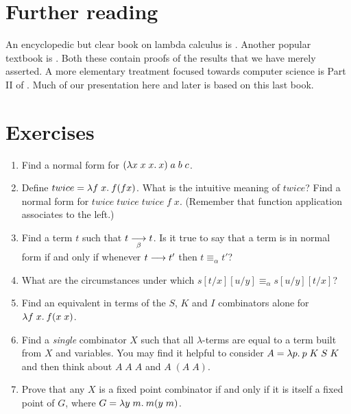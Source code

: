%
%
%

\section*{Further reading}

An encyclopedic but clear book on lambda calculus is .
Another popular textbook is . Both these contain proofs
of the results that we have merely asserted. A more elementary treatment
focused towards computer science is Part II of . Much of our
presentation here and later is based on this last book.

\section*{Exercises}

\begin{enumerate}

\item Find a normal form for $(\lambda x\; x\; x.\: x)\; a\; b\; c$.

\item Define $twice = \lambda f\; x.\: f(f x)$. What is the intuitive meaning of
$twice$? Find a normal form for $twice\; twice\; twice\; f\; x$. (Remember that
function application associates to the left.)

\item Find a term $t$ such that $t \mathrel{\mathop{\longrightarrow}\limits_{\beta}} t$. Is it true to say that a term is
in normal form if and only if whenever $t \longrightarrow t'$ then $t \equiv_{\alpha}
t'$?

\item What are the circumstances under which $s [t/x] [u/y] \equiv_{\alpha} s
[u/y] [t/x]$?

\item Find an equivalent in terms of the $S$, $K$ and $I$ combinators alone for
$\lambda f\; x.\: f(x\; x)$.

\item Find a {\em single} combinator $X$ such that all $\lambda$-terms are
equal to a term built from $X$ and variables. You may find it helpful to
consider $A = \lambda p.\: p\; K\; S\; K$ and then think about $A\; A\; A$ and $A\;
(A\; A)$.

\item Prove that any $X$ is a fixed point combinator if and only if it is
itself a fixed point of $G$, where $G = \lambda y\; m.\: m(y\; m)$.

\end{enumerate}

